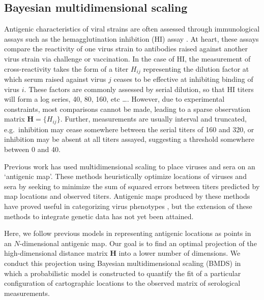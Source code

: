 \documentclass[11pt,oneside,letterpaper]{article}
\begin{document}
\subsection*{Bayesian multidimensional scaling}

Antigenic characteristics of viral strains are often assessed through immunological assays such as the hemagglutination inhibition (HI) assay \cite{Hirst43}.  
At heart, these assays compare the reactivity of one virus strain to antibodies raised against another virus strain via challenge or vaccination.  
In the case of HI, the measurement of cross-reactivity takes the form of a titer $H_{ij}$ representing the dilution factor at which serum raised against virus $j$ ceases to be effective at inhibiting binding of virus $i$.  
These factors are commonly assessed by serial dilution, so that HI titers will form a log series, 40, 80, 160, etc \dots.
However, due to experimental constraints, most comparisons cannot be made, leading to a sparse observation matrix $\mathbf{H} = \{H_{ij}\}$.  
Further, measurements are usually interval and truncated, e.g.\ inhibition may cease somewhere between the serial titers of 160 and 320, or inhibition may be absent at all titers assayed, suggesting a threshold somewhere between 0 and 40.  

Previous work \cite{Smith04, Cai10} has used multidimensional scaling to place viruses and sera on an `antigenic map'.  
These methods heuristically optimize locations of viruses and sera by seeking to minimize the sum of squared errors between titers predicted by map locations and observed titers.  
Antigenic maps produced by these methods have proved useful in categorizing virus phenotypes \cite{Smith04}, but the extension of these methods to integrate genetic data has not yet been attained.

Here, we follow previous models in representing antigenic locations as points in an $N$-dimensional antigenic map. 
Our goal is to find an optimal projection of the high-dimensional distance matrix $\mathbf{H}$ into a lower number of dimensions. 
We conduct this projection using Bayesian multidimensional scaling (BMDS) \cite{Oh01} in which a probabilistic model is constructed to quantify the fit of a particular configuration of cartographic locations to the observed matrix of serological measurements.
\end{document}
